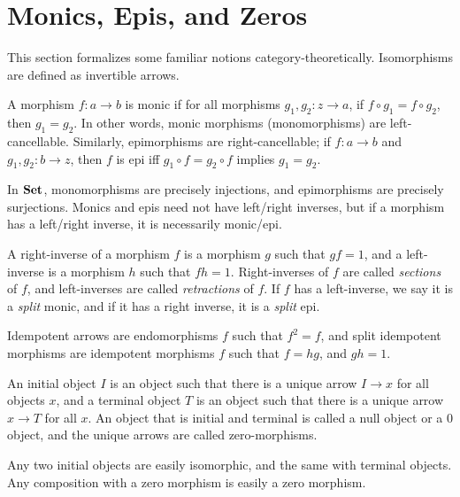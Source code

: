 \section{Monics, Epis, and Zeros}

This section formalizes some familiar notions category-theoretically. Isomorphisms are defined as invertible arrows.

\begin{definition}\label{dfn:1.6}
	A morphism $f : a \to b$ is monic if for all morphisms $g_1,g_2 : z \to a$, if $f\circ g_1=f\circ g_2$, then $g_1=g_2$. In other words, monic morphisms (monomorphisms) are left-cancellable. Similarly, epimorphisms are right-cancellable; if $f : a \to b$ and $g_1,g_2: b \to z$, then $f$ is epi iff $g_1\circ f=g_2\circ f$ implies $g_1=g_2$.
\end{definition}

In $\mathbf{Set} $, monomorphisms are precisely injections, and epimorphisms are precisely surjections. Monics and epis need not have left/right inverses, but if a morphism has a left/right inverse, it is necessarily monic/epi.

\begin{definition}\label{dfn:1.7}
	A right-inverse of a morphism $f$ is a morphism $g$ such that $gf=1$, and a left-inverse is a morphism $h$ such that $fh=1$. Right-inverses of $f$ are called \emph{sections} of $f$, and left-inverses are called \emph{retractions} of $f$. If $f$ has a left-inverse, we say it is a \emph{split} monic, and if it has a right inverse, it is a \emph{split} epi.
\end{definition}

Idempotent arrows are endomorphisms $f$ such that $f^2=f$, and split idempotent morphisms are idempotent morphisms $f$ such that $f=hg$, and $gh=1$.

\begin{definition}\label{dfn:1.8}
	An initial object $I$ is an object such that there is a unique arrow $I\to x$ for all objects $x$, and a terminal object $T$ is an object such that there is a unique arrow $x\to T$ for all $x$. An object that is initial and terminal is called a null object or a 0 object, and the unique arrows are called zero-morphisms.
\end{definition}

Any two initial objects are easily isomorphic, and the same with terminal objects. Any composition with a zero morphism is easily a zero morphism.

